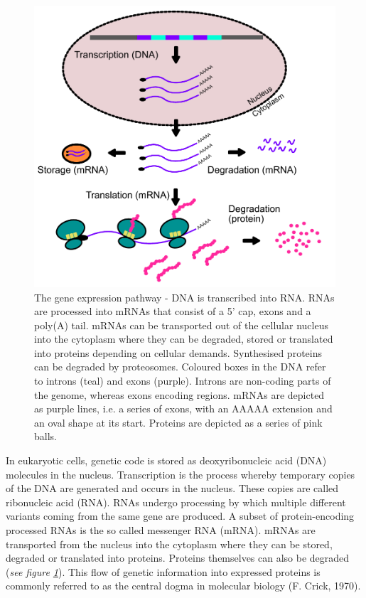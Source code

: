 \documentclass[12pt,openany]{book}
\begin{document}
\begin{figure}
  \includegraphics{./figures/geneExprPath_2.pdf}
  \caption{The gene expression pathway - DNA is transcribed into RNA. RNAs are processed into mRNAs that consist of a 5' cap, exons and a poly(A) tail. mRNAs can be transported out of the cellular nucleus into the cytoplasm where they can be degraded, stored or translated into proteins depending on cellular demands. Synthesised proteins can be degraded by proteosomes. Coloured boxes in the DNA refer to introns (teal) and exons (purple). Introns are non-coding parts of the genome, whereas exons encoding regions. mRNAs are depicted as purple lines, i.e. a series of exons, with an AAAAA extension and an oval shape at its start. Proteins are depicted as a series of pink balls.  \label{fig:geneExprPath}}
\end{figure}

In eukaryotic cells, genetic code is stored as deoxyribonucleic acid
(DNA) molecules in the nucleus. Transcription is the process whereby
temporary copies of the DNA are generated and occurs in the nucleus.
These copies are called ribonucleic acid (RNA). RNAs undergo processing
by which multiple different variants coming from the same gene are
produced. A subset of protein-encoding processed RNAs is the so called
messenger RNA (mRNA). mRNAs are transported from the nucleus into the
cytoplasm where they can be stored, degraded or translated into
proteins. Proteins themselves can also be degraded (\emph{see figure
\ref{fig:geneExprPath}}). This flow of genetic information into
expressed proteins is commonly referred to as the central dogma in
molecular biology (F. Crick, 1970). \clearpage
\end{document}
